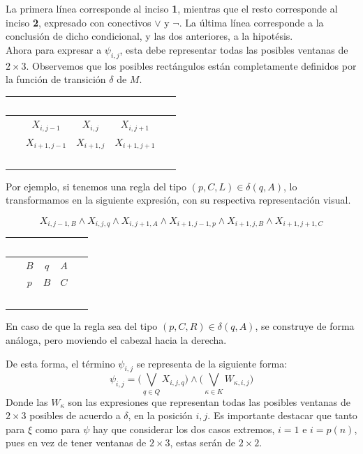 \documentclass[a4paper]{article}
\begin{document}
La primera línea corresponde al inciso {\bfseries 1}, mientras que el resto corresponde al inciso {\bfseries 2}, expresado con conectivos $\lor$ y $\lnot$. La última línea corresponde a la conclusión de dicho condicional, y las dos anteriores, a la hipotésis.\\

Ahora para expresar a $\psi_{i,j}$, esta debe representar todas las posibles ventanas de $2 \times 3$. Observemos que los posibles rectángulos están completamente definidos por la función de transición $\delta$ de $M$.

\begin{table}[h]
  \begin{center}
    \begin{tabular}{c | c | c | c | c}
      \  & \  & \  & \  & \   \\
      \hline
      $\ $ & $X_{i,j-1}$ & $X_{i,j}$ & $X_{i,j+1}$ & $\ $ \\
      \hline
      $\ $ & $X_{i+1,j-1}$ & $X_{i+1,j}$ & $X_{i+1,j+1}$ & $\ $ \\
      \hline
      \  & \  & \  & \  & \
    \end{tabular}
  \end{center}
\end{table}

Por ejemplo, si tenemos una regla del tipo $(p,C,L) \in \delta (q,A)$, lo transformamos en la siguiente expresión, con su respectiva representación visual.

$$X_{i,j-1,B} \land X_{i,j,q} \land X_{i,j+1,A} \land X_{i+1,j-1,p} \land X_{i+1,j,B} \land X_{i+1,j+1,C}$$

\begin{table}[h]
  \begin{center}
    \begin{tabular}{c | c | c | c | c}
      \  & \  & \  & \  & \   \\
      \hline
      $\ $ & $B$ & $q$ & $A$ & $\ $ \\
      \hline
      $\ $ & $p$ & $B$ & $C$ & $\ $ \\
      \hline
      \  & \  & \  & \  & \
    \end{tabular}
  \end{center}
\end{table}

En caso de que la regla sea del tipo $(p,C,R) \in \delta (q,A)$, se construye de forma análoga, pero moviendo el cabezal hacia la derecha.

De esta forma, el término $\psi_{i,j}$ se representa de la siguiente forma:
$$\psi_{i,j} = \Big(\bigvee_{q \in Q} X_{i,j,q}\Big) \land \Big(\bigvee_{\kappa\in K}W_{\kappa,i,j}\Big)$$
Donde las $W_\kappa$ son las expresiones que representan todas las posibles ventanas de $2 \times 3$ posibles de acuerdo a $\delta$, en la posición $i,j$. Es importante destacar que tanto para $\xi$ como para $\psi$ hay que considerar los dos casos extremos, $i=1$ e $i=p(n)$, pues en vez de tener ventanas de $2 \times 3$, estas serán de $2 \times 2$.\\
\end{document}
